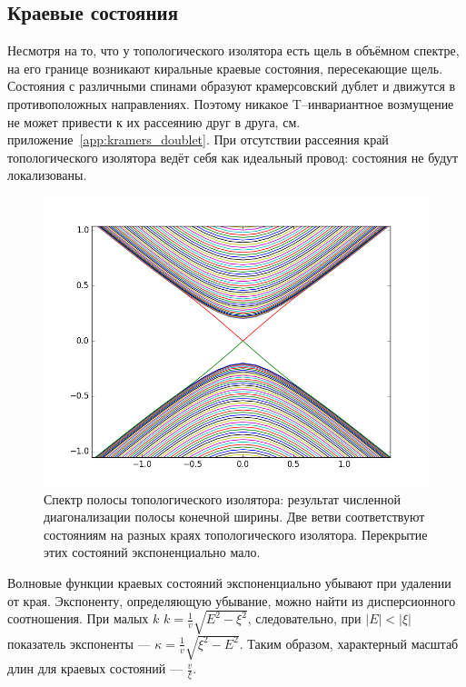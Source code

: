 \subsection{Краевые состояния}
Несмотря на то, что у топологического изолятора есть щель в объёмном спектре,
на его границе возникают киральные
краевые состояния, пересекающие щель.  
Состояния с различными спинами образуют крамерсовский дублет и
движутся в противоположных направлениях. Поэтому никакое T--инвариантное возмущение не может
привести к их рассеянию друг в друга, см. приложение~\ref{app:kramers_doublet}. 
При отсутствии рассеяния край топологического изолятора
ведёт себя как идеальный провод: состояния не будут локализованы.

\begin{figure}[h]
    \centering
    \includegraphics[width=0.6\linewidth]{edge_states.png}
    \caption{Спектр полосы топологического изолятора: 
             результат численной диагонализации полосы конечной ширины. 
             Две ветви соответствуют состояниям на разных краях топологического изолятора.
             Перекрытие этих состояний экспоненциально мало.}
\end{figure}

Волновые функции краевых состояний экспоненциально убывают при удалении от края. Экспоненту,
определяющую убывание, можно найти из дисперсионного соотношения. При малых $k$ 
$k = \frac{1}{v}\sqrt{E^2 - \xi^2}$, следовательно, при $|E| < |\xi|$ показатель экспоненты ---
$\kappa = \frac{1}{v}\sqrt{\xi^2 - E^2}$. Таким образом, характерный масштаб длин для
краевых состояний --- $\frac{v}{\xi}$.

